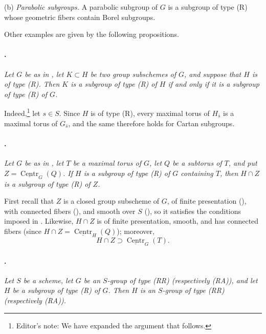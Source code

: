 \textup{(b)} \emph{Parabolic subgroups.} A parabolic subgroup of
\(G\) is a subgroup of type \textup{(R)} whose geometric fibers
contain Borel subgroups.

Other examples are given by the following propositions.

\paragraph{.}
\textit{Let \(G\) be as in , let \(K\subset H\) be two group
subschemes of \(G\), and suppose that \(H\) is of type
\textup{(R)}. Then \(K\) is a subgroup of type \textup{(R)} of
\(H\) if and only if it is a subgroup of type \textup{(R)} of
\(G\).}

Indeed,\footnote{Editor's note: We have expanded the argument that
follows.} let \(s\in S\). Since \(H\) is of type \textup{(R)},
every maximal torus of \(H_{\bar s}\) is a maximal torus of
\(G_{\bar s}\), and the same therefore holds for Cartan subgroups.

\paragraph{.}
\textit{Let \(G\) be as in , let \(T\) be a maximal torus of
\(G\), let \(Q\) be a subtorus of \(T\), and put
\(Z=\underline{\operatorname{Centr}}_G(Q)\). If \(H\) is a
subgroup of type \textup{(R)} of \(G\) containing \(T\), then
\(H\cap Z\) is a subgroup of type \textup{(R)} of \(Z\).}

First recall that \(Z\) is a closed group subscheme of \(G\), of
finite presentation (), with connected fibers
(), and smooth over \(S\) (), so it
satisfies the conditions imposed in . Likewise,
\(H\cap Z\) is of finite presentation, smooth, and has connected
fibers (since
\(H\cap Z=\underline{\operatorname{Centr}}_H(Q)\)); moreover,
\[
  H\cap Z\supset\underline{\operatorname{Centr}}_G(T).
\]

\paragraph{.}
\textit{Let \(S\) be a scheme, let \(G\) be an \(S\)-group of type
\textup{(RR)} \textup{(respectively \textup{(RA)})}, and let \(H\)
be a subgroup of type \textup{(R)} of \(G\). Then \(H\) is an
\(S\)-group of type \textup{(RR)} \textup{(respectively
\textup{(RA)})}.}

